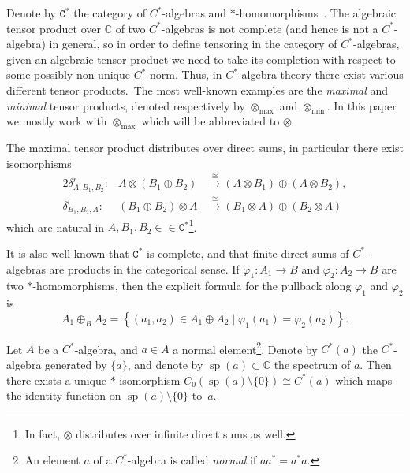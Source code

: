 \documentclass[10pt]{simplearticle}
\newcommand{\Cstar}{\mathtt{C^{*}}}
\newcommand{\spec}{\operatorname{sp}}
\begin{document}
Denote by $\Cstar$ the category of $C^{*}$-algebras and $*$-homomorphisms~\cite{murphy1990}.
The algebraic tensor product over $\mathbb{C}$ of two $C^{*}$-algebras
is not complete (and hence is not a $C^{*}$-algebra) in general,
so in order to define tensoring in the category of $C^{*}$-algebras,
given an algebraic tensor product we need to take its completion with
respect to some possibly non-unique $C^{*}$-norm. Thus, in $C^{*}$-algebra
theory there exist various different tensor products.\ 
The most well-known
examples are the \emph{maximal} and \emph{minimal} tensor products,
denoted respectively by $\otimes_{\max}$ and $\otimes_{\min}$. In
this paper we mostly work with $\otimes_{\max}$ which will be abbreviated
to $\otimes$.

The maximal tensor product distributes over direct sums, in particular
there exist isomorphisms
\begin{alignat*}{2}
\delta^{r}_{A,B_{1},B_{2}}\colon & A\otimes(B_{1}\oplus B_{2}) & \xrightarrow{\cong}(A\otimes B_{1})\oplus(A\otimes B_{2}),\\
\delta^{l}_{B_{1},B_{2},A}\colon & (B_{1}\oplus B_{2})\otimes A & \xrightarrow{\cong}(B_{1}\otimes A)\oplus(B_{2}\otimes A)
\end{alignat*}
which are natural in $A,B_{1},B_{2}\in\in\Cstar$\footnote{In fact, $\otimes$ distributes over infinite direct sums as well.}.

It is also well-known that $\Cstar$ is complete, and that finite
direct sums of $C^{*}$-algebras are products in the categorical sense.
If $\varphi_{1}\colon A_{1}\to B$ and $\varphi_{2}\colon A_{2}\to B$
are two $*$-homomorphisms, then the explicit formula for the pullback
along $\varphi_{1}$ and $\varphi_{2}$ is
\begin{equation}
A_{1}\oplus_{B}A_{2}=\left\{ (a_{1},a_{2})\in A_{1}\oplus A_{2}\mid\varphi_{1}(a_{1})=\varphi_{2}(a_{2})\right\} .\label{eq:explicit-pullback}
\end{equation}

\begin{lem}
\label{lem:spectrum} Let
$A$ be a $C^{*}$-algebra, and $a\in A$ a normal element\footnote{An element $a$ of a $C^{*}$-algebra is called \emph{normal} if $aa^{*}=a^{*}a$.}.
Denote by $C^{*}(a)$ the $C^{*}$-algebra generated by $\{a\}$,
and denote
by $\spec(a)\subset\mathbb{C}$ the spectrum
of $a$. Then there exists a unique $*$-isomorphism $C_{0}(\spec(a)\setminus\{0\})\cong C^{*}(a)$
which maps the identity function on $\spec(a)\setminus\{0\}$ to~$a$.
\end{lem}
\end{document}
